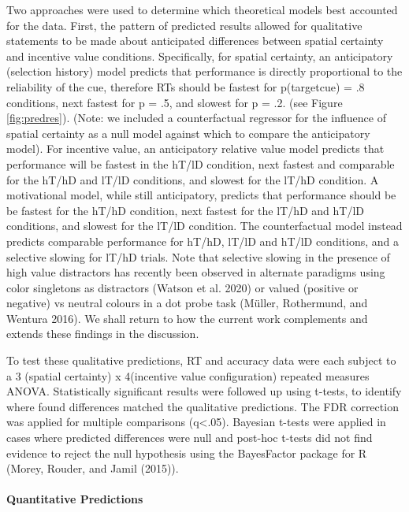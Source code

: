 \documentclass[11pt,halfline,a4paper,]{ouparticle}
\begin{document}
Two approaches were used to determine which theoretical models best accounted for the data. First, the pattern of predicted results allowed for qualitative statements to be made about anticipated differences between spatial certainty and incentive value conditions. Specifically, for spatial certainty, an anticipatory (selection history) model predicts that performance is directly proportional to the reliability of the cue, therefore RTs should be fastest for p(target\textbar cue) = .8 conditions, next fastest for p = .5, and slowest for p = .2. (see Figure \ref{fig:predres}). (Note: we included a counterfactual regressor for the influence of spatial certainty as a null model against which to compare the anticipatory model). For incentive value, an anticipatory relative value model predicts that performance will be fastest in the hT/lD condition, next fastest and comparable for the hT/hD and lT/lD conditions, and slowest for the lT/hD condition. A motivational model, while still anticipatory, predicts that performance should be be fastest for the hT/hD condition, next fastest for the lT/hD and hT/lD conditions, and slowest for the lT/lD condition. The counterfactual model instead predicts comparable performance for hT/hD, lT/lD and hT/lD conditions, and a selective slowing for lT/hD trials. Note that selective slowing in the presence of high value distractors has recently been observed in alternate paradigms using color singletons as distractors (Watson et al. 2020) or valued (positive or negative) vs neutral colours in a dot probe task (Müller, Rothermund, and Wentura 2016). We shall return to how the current work complements and extends these findings in the discussion.

To test these qualitative predictions, RT and accuracy data were each subject to a 3 (spatial certainty) x 4(incentive value configuration) repeated measures ANOVA. Statistically significant results were followed up using t-tests, to identify where found differences matched the qualitative predictions. The FDR correction was applied for multiple comparisons (q\textless.05). Bayesian t-tests were applied in cases where predicted differences were null and post-hoc t-tests did not find evidence to reject the null hypothesis using the BayesFactor package for R (Morey, Rouder, and Jamil (2015)).

\hypertarget{quantitative-predictions}{%
\paragraph{Quantitative Predictions}\label{quantitative-predictions}}
\end{document}
